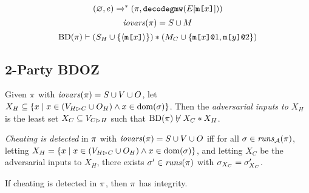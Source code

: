 \begin{lemma}
  $$ (\varnothing,e) \xrightarrow{}^{*} (\pi,\texttt{decodegmw}(E[\texttt{m[}x\texttt{]}])) $$
  $$\mathit{iovars}(\pi) = S \cup M$$
  $$\mathrm{BD}(\pi) \vdash (S_H \cup \{ \langle \texttt{m[}x\texttt{]} \rangle \}) * (M_C \cup \{ \texttt{m[}x\texttt{]}\texttt{@}1, \texttt{m[}y\texttt{]}\texttt{@}2 \})$$
\end{lemma}


\subsection{2-Party BDOZ}



\begin{definition}
  Given $\pi$ with $\mathit{iovars}(\pi) = S \cup V \cup O$,
  let $X_H \subseteq \{ x \mid x \in (V_{H \rhd C} \cup O_H) \wedge x \in \mathrm{dom}(\sigma) \}$.
  Then the \emph{adversarial inputs to $X_H$} is the least set
  $X_C \subseteq V_{C \rhd H}$ such that $\mathrm{BD}(\pi) \not\vdash X_C * X_H$.
\end{definition}
\begin{definition}
  \emph{Cheating is detected} in $\pi$ with $\mathit{iovars}(\pi) = S \cup V \cup O$ iff
  for all  $\sigma \in \mathit{runs}_{\mathcal{A}}(\pi)$,
  letting $X_H = \{ x \mid x \in (V_{H \rhd C} \cup O_H) \wedge x \in \mathrm{dom}(\sigma) \}$,
  and letting $X_C$ be the adversarial inputs to $X_H$,
  there exists $\sigma'\in \mathit{runs}(\pi)$
  with $\sigma_{X_C} = \sigma'_{X_C}$.  
\end{definition}

\begin{lemma}
  If cheating is detected in $\pi$, then $\pi$ has integrity.
\end{lemma}
